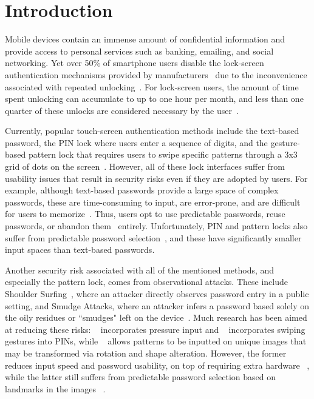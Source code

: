 \documentclass{sigchi}
\begin{document}

\section{Introduction}
Mobile devices contain an immense amount of confidential information and provide access to personal services such as banking, emailing, and social networking. Yet over 50\% of smartphone users disable the lock-screen authentication mechanisms provided by manufacturers~\cite{consumer_reports_smart_2014} due to the inconvenience associated with repeated unlocking~\cite{egelman_are_2014}. For lock-screen users, the amount of time spent unlocking can accumulate to up to one hour per month, and less than one quarter of these unlocks are considered necessary by the user~\cite{riva_progressive_2012,harbach_itsa_2014}. 

Currently, popular touch-screen authentication methods include the text-based password, the PIN lock where users enter a sequence of digits, and the gesture-based pattern lock that requires users to swipe specific patterns through a 3x3 grid of dots on the screen~\cite{andriotis_pilot_2013}. However, all of these lock interfaces suffer from usability issues that result in security risks even if they are adopted by users. For example, although text-based passwords provide a large space of complex passwords, these are time-consuming to input, are error-prone, and are difficult for users to memorize~\cite{schloglhofer_secure_2012,andriotis_pilot_2013,egelman_are_2014}. Thus, users opt to use predictable passwords, reuse passwords, or abandon them~\cite{biddle_graphical_2012} entirely. Unfortunately, PIN and pattern locks also suffer from predictable password selection~\cite{uellenbeck_quantifying_2013,arif_use_2014,arif_tap_2013}, and these have significantly smaller input spaces than text-based passwords. 

Another security risk associated with all of the mentioned methods, and especially the pattern lock, comes from observational attacks. These include Shoulder Surfing~\cite{von_zezschwitz_making_2013,egelman_are_2014}, where an attacker directly observes password entry in a public setting, and Smudge Attacks, where an attacker infers a password based solely on the oily residues or ``smudges" left on the device~\cite{egelman_are_2014}. Much research has been aimed at reducing these risks: ~\cite{arif_use_2014} incorporates pressure input and ~\cite{arif_tap_2013} incorporates swiping gestures into PINs, while ~\cite{schneegass_smudgesafe:_2014,von_zezschwitz_making_2013} allows patterns to be inputted on unique images that may be transformed via rotation and shape alteration. However, the former reduces input speed and password usability, on top of requiring extra hardware ~\cite{arif_use_2014,arif_tap_2013}, while the latter still suffers from predictable password selection based on landmarks in the images ~\cite{andriotis_pilot_2013}.
\end{document}
